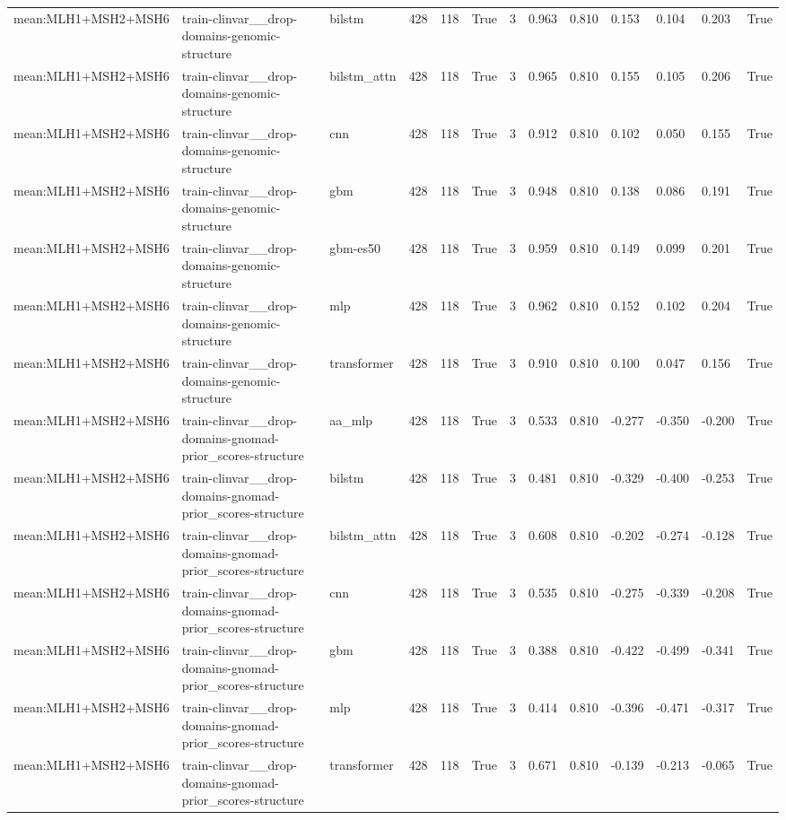 \begin{table}[t]
\begin{tabular}{lllllllllllll}
mean:MLH1+MSH2+MSH6 & train-clinvar\_\_drop-domains-genomic-structure & bilstm & 428 & 118 & True & 3 & 0.963 & 0.810 & 0.153 & 0.104 & 0.203 & True \\
mean:MLH1+MSH2+MSH6 & train-clinvar\_\_drop-domains-genomic-structure & bilstm\_attn & 428 & 118 & True & 3 & 0.965 & 0.810 & 0.155 & 0.105 & 0.206 & True \\
mean:MLH1+MSH2+MSH6 & train-clinvar\_\_drop-domains-genomic-structure & cnn & 428 & 118 & True & 3 & 0.912 & 0.810 & 0.102 & 0.050 & 0.155 & True \\
mean:MLH1+MSH2+MSH6 & train-clinvar\_\_drop-domains-genomic-structure & gbm & 428 & 118 & True & 3 & 0.948 & 0.810 & 0.138 & 0.086 & 0.191 & True \\
mean:MLH1+MSH2+MSH6 & train-clinvar\_\_drop-domains-genomic-structure & gbm-es50 & 428 & 118 & True & 3 & 0.959 & 0.810 & 0.149 & 0.099 & 0.201 & True \\
mean:MLH1+MSH2+MSH6 & train-clinvar\_\_drop-domains-genomic-structure & mlp & 428 & 118 & True & 3 & 0.962 & 0.810 & 0.152 & 0.102 & 0.204 & True \\
mean:MLH1+MSH2+MSH6 & train-clinvar\_\_drop-domains-genomic-structure & transformer & 428 & 118 & True & 3 & 0.910 & 0.810 & 0.100 & 0.047 & 0.156 & True \\
mean:MLH1+MSH2+MSH6 & train-clinvar\_\_drop-domains-gnomad-prior\_scores-structure & aa\_mlp & 428 & 118 & True & 3 & 0.533 & 0.810 & -0.277 & -0.350 & -0.200 & True \\
mean:MLH1+MSH2+MSH6 & train-clinvar\_\_drop-domains-gnomad-prior\_scores-structure & bilstm & 428 & 118 & True & 3 & 0.481 & 0.810 & -0.329 & -0.400 & -0.253 & True \\
mean:MLH1+MSH2+MSH6 & train-clinvar\_\_drop-domains-gnomad-prior\_scores-structure & bilstm\_attn & 428 & 118 & True & 3 & 0.608 & 0.810 & -0.202 & -0.274 & -0.128 & True \\
mean:MLH1+MSH2+MSH6 & train-clinvar\_\_drop-domains-gnomad-prior\_scores-structure & cnn & 428 & 118 & True & 3 & 0.535 & 0.810 & -0.275 & -0.339 & -0.208 & True \\
mean:MLH1+MSH2+MSH6 & train-clinvar\_\_drop-domains-gnomad-prior\_scores-structure & gbm & 428 & 118 & True & 3 & 0.388 & 0.810 & -0.422 & -0.499 & -0.341 & True \\
mean:MLH1+MSH2+MSH6 & train-clinvar\_\_drop-domains-gnomad-prior\_scores-structure & mlp & 428 & 118 & True & 3 & 0.414 & 0.810 & -0.396 & -0.471 & -0.317 & True \\
mean:MLH1+MSH2+MSH6 & train-clinvar\_\_drop-domains-gnomad-prior\_scores-structure & transformer & 428 & 118 & True & 3 & 0.671 & 0.810 & -0.139 & -0.213 & -0.065 & True \\

\end{tabular}
\end{table}
